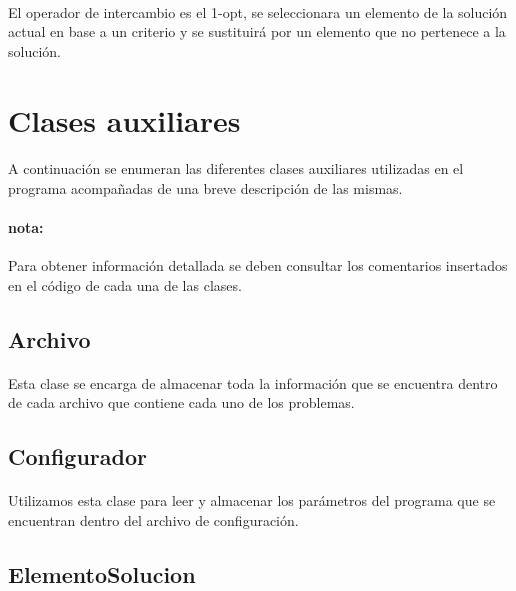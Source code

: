 \documentclass{article}
\begin{document}
	\paragraph{}El operador de intercambio es el 1-opt, se seleccionara un elemento de la solución actual en base a un criterio y se sustituirá por un elemento que no pertenece a la solución. 
	
	\section{Clases auxiliares}
	
	\paragraph{} A continuación se enumeran las diferentes clases auxiliares utilizadas en el programa acompañadas de una breve descripción de las mismas.
	
	\paragraph{nota:}Para obtener información detallada se deben consultar los comentarios insertados en el código de cada una de las clases.
	
	\subsection{Archivo}
	
	\paragraph{}Esta clase se encarga de almacenar toda la información que se encuentra dentro de cada archivo que contiene cada uno de los problemas.
	
	
	\subsection{Configurador}
	
	\paragraph{}Utilizamos esta clase para leer y almacenar los parámetros del programa que se encuentran dentro del archivo de configuración.
	
	\subsection{ElementoSolucion}
	
\end{document}
